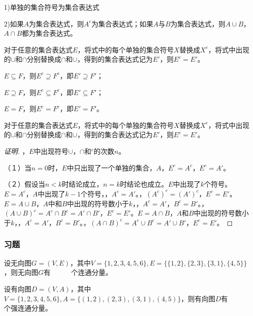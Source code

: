 \documentclass{beamer}
\begin{document}
\begin{CJK*}{UTF8}{gbsn}
\begin{frame}
\begin{Def1}
    1)单独的集合符号为集合表达式

    2)如果$A$为集合表达式，则$A^c$为集合表达式；如果$A$与$B$为集合表达式，则$A\cup B$，$A\cap B$都为集合表达式。
  \end{Def1}
\end{frame}
\begin{frame}
  \begin{Thm4}
    对于任意的集合表达式$E$，将式中的每个单独的集合符号$X$替换成$X^c$，将式中出现的$\cup$和$\cap$分别替换成$\cap$和$\cup$，得到的集合表达式记为$E'$，则$E^c=E'$。
  \end{Thm4}

  $E\subseteq F$，则$E^c\supseteq F^c$，即$E'\supseteq F'$；

  $E\supseteq F$，则$E^c\subseteq F^c$，即$E'\subseteq F'$；

  $E=F$，则$E^c=F^c$，即$E'=F'$。
\end{frame}

\begin{frame}
  \begin{Thm4}
    对于任意的集合表达式$E$，将式中的每个单独的集合符号$X$替换成$X^c$，将式中出现的$\cup$和$\cap$分别替换成$\cap$和$\cup$，得到的集合表达式记为$E'$，则$E^c=E'$。
  \end{Thm4}
  \pause\begin{proof}[证明]\justifying\let\raggedright\justifying
    ，$E$中出现符号$\cup$，$\cap$和$^c$的次数$n$。

    \pause（１）当$n=0$时，\pause$E$中只出现了一个单独的集合，$A$，$E^c=A^c$，$E^c=A'$。

    \pause（２）假设当$n<k$时结论成立，$n=k$时结论也成立。$E$中出现了$k$个符号。$E=A^c$，$A$中出现了$k-1$个符号，，\pause $A^c=A'$。，\pause$(A^c)^c=(A')^c$，$E^c=E'$。$E=A\cup B$，$A$中和$B$中出现的符号数小于$k$，，\pause$A^c=A'$，\pause$B^c=B'$。，\pause$(A\cup B)^c=A^c\cap B^c=A'\cap B'$，$E^c=E'$。$E=A\cap B$，$A$和$B$中出现的符号数小于$k$，，\pause$A^c=A'$，\pause$B^c=B'$。，\pause$(A\cap B)^c=A^c\cup B^c=A'\cup B'$，$E^c=E'$。
  \end{proof}
\end{frame}
\begin{frame}
  \frametitle{习题}
  \begin{Exercise}\justifying\let\raggedright\justifying
    设无向图$G=(V,E)$，其中$V=\{1,2,3,4,5,6\}, E = \{\{1,2\},\{2,3\},\{3,1\},
    \{4,5\}\}$，则无向图$G$有\underline{$\quad\quad\quad$}个连通分量。
  \end{Exercise}
    \begin{Exercise}\justifying\let\raggedright\justifying
    设有向图$D=(V,A)$，其中$V=\{1,2,3,4,5,6\}, A =\{(1,2),(2,3),(3,1),
    (4,5)\}$，则有向图$D$有\underline{$\quad\quad\quad$}个强连通分量。
  \end{Exercise}

\end{frame}
\end{CJK*}
\end{document}
